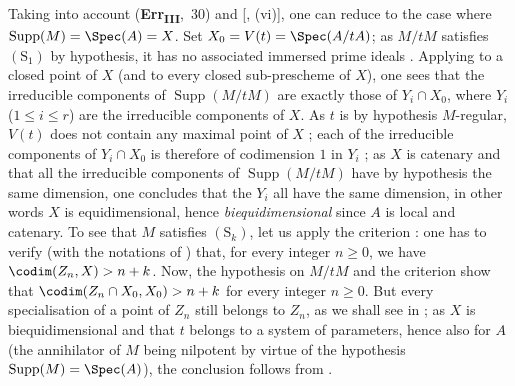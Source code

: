 Taking into account (\textbf{Err}\textsubscript{\textbf{III}},~30) and [, (vi)], one can reduce to the case where $\operatorname{Supp}(M)=\Spec(A)=X$.
Set $X_0=V(t)=\Spec(A/tA)$; as $M/tM$ satisfies $(\mathrm{S}_1)$ by hypothesis, it has no associated immersed prime ideals .
Applying  to a closed point of $X$ (and to every closed sub-prescheme of $X$), one sees that the irreducible components of $\operatorname{Supp}(M/tM)$ are exactly those of $Y_i\cap X_0$, where $Y_i$ ($1\leqslant i\leqslant r$) are the irreducible components of $X$.
As $t$ is by hypothesis $M$-regular, $V(t)$ does not contain any maximal point of $X$ ; each of the irreducible components of $Y_i\cap X_0$ is therefore of codimension $1$ in $Y_i$ ; as $X$ is catenary and that all the irreducible components of $\operatorname{Supp}(M/tM)$ have by hypothesis the same dimension, one concludes that the $Y_i$ all have the same dimension, in other words $X$ is equidimensional, hence \emph{biequidimensional} since $A$ is local and catenary.
To see that $M$ satisfies $(\mathrm{S}_k)$, let us apply the criterion : one has to verify (with the notations of ) that, for every integer $n\geqslant 0$, we have $\codim(Z_n,X)>n+k$.
Now, the hypothesis on $M/tM$ and the criterion  show that $\codim(Z_n\cap X_0,X_0)>n+k$ for every integer $n\geqslant 0$.
But every specialisation of a point of $Z_n$ still belongs to $Z_n$, as we shall see in ; as $X$ is biequidimensional and that $t$ belongs to a system of parameters, hence also for $A$ (the annihilator of $M$ being nilpotent by virtue of the hypothesis $\operatorname{Supp}(M)=\Spec(A)$), the conclusion follows from .


